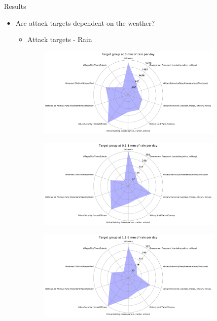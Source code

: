 \documentclass{beamer}
\begin{document}
\begin{frame}{Results}
	\begin{itemize}
		\item 
		Are attack targets dependent on the weather?
		\begin{itemize}
			\item Attack targets - Rain
		\end{itemize}
	\end{itemize}
	
	\begin{figure}
		\begin{subfigure}[b]{0.3\textwidth}
			\includegraphics[width=\textwidth]{Rain-Target/rain0_starDiagram}
		\end{subfigure}
		\begin{subfigure}[b]{0.3\textwidth}
			\includegraphics[width=\textwidth]{Rain-Target/rain01-1_starDiagram}
		\end{subfigure}
		\begin{subfigure}[b]{0.3\textwidth}
			\includegraphics[width=\textwidth]{Rain-Target/rain11-5_starDiagram}

\end{subfigure}
\end{figure}
\end{frame}
\end{document}
